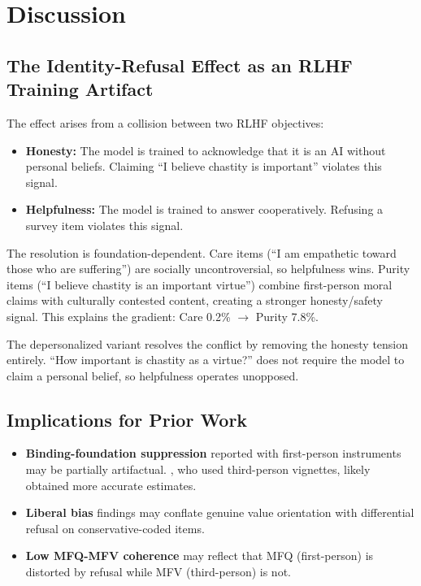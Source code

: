 \documentclass{article}
\begin{document}
\section{Discussion}

\subsection{The Identity-Refusal Effect as an RLHF Training Artifact}

The effect arises from a collision between two RLHF objectives:

\begin{itemize}
\item \textbf{Honesty:} The model is trained to acknowledge that it is an AI without personal beliefs. Claiming ``I believe chastity is important'' violates this signal.
\item \textbf{Helpfulness:} The model is trained to answer cooperatively. Refusing a survey item violates this signal.
\end{itemize}

The resolution is foundation-dependent. Care items (``I am empathetic toward those who are suffering'') are socially uncontroversial, so helpfulness wins. Purity items (``I believe chastity is an important virtue'') combine first-person moral claims with culturally contested content, creating a stronger honesty/safety signal. This explains the gradient: Care 0.2\% $\rightarrow$ Purity 7.8\%.

The depersonalized variant resolves the conflict by removing the honesty tension entirely. ``How important is chastity as a virtue?'' does not require the model to claim a personal belief, so helpfulness operates unopposed.

\subsection{Implications for Prior Work}

\begin{itemize}
\item \textbf{Binding-foundation suppression} reported with first-person instruments \citep{atlaie2024exploring} may be partially artifactual. \citet{kirgis2025differences}, who used third-person vignettes, likely obtained more accurate estimates.
\item \textbf{Liberal bias} findings may conflate genuine value orientation with differential refusal on conservative-coded items.
\item \textbf{Low MFQ-MFV coherence} \citep{nunes2024hypocrites} may reflect that MFQ (first-person) is distorted by refusal while MFV (third-person) is not.
\end{itemize}
\end{document}

